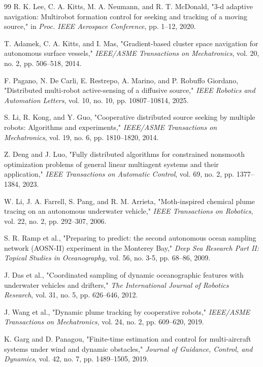 \documentclass[lettersize,journal]{IEEEtran}
\begin{document}
\begin{thebibliography}{99}
 R. K. Lee, C. A. Kitts, M. A. Neumann, and R. T. McDonald, "3-d adaptive navigation: Multirobot formation control for seeking and tracking of a moving source," in \textit{Proc. IEEE Aerospace Conference}, pp. 1--12, 2020.

 T. Adamek, C. A. Kitts, and I. Mas, "Gradient-based cluster space navigation for autonomous surface vessels," \textit{IEEE/ASME Transactions on Mechatronics}, vol. 20, no. 2, pp. 506--518, 2014.

 F. Pagano, N. De Carli, E. Restrepo, A. Marino, and P. Robuffo Giordano, "Distributed multi-robot active-sensing of a diffusive source," \textit{IEEE Robotics and Automation Letters}, vol. 10, no. 10, pp. 10807--10814, 2025.

 S. Li, R. Kong, and Y. Guo, "Cooperative distributed source seeking by multiple robots: Algorithms and experiments," \textit{IEEE/ASME Transactions on Mechatronics}, vol. 19, no. 6, pp. 1810--1820, 2014.

 Z. Deng and J. Luo, "Fully distributed algorithms for constrained nonsmooth optimization problems of general linear multiagent systems and their application," \textit{IEEE Transactions on Automatic Control}, vol. 69, no. 2, pp. 1377--1384, 2023.

 W. Li, J. A. Farrell, S. Pang, and R. M. Arrieta, "Moth-inspired chemical plume tracing on an autonomous underwater vehicle," \textit{IEEE Transactions on Robotics}, vol. 22, no. 2, pp. 292--307, 2006.

 S. R. Ramp et al., "Preparing to predict: the second autonomous ocean sampling network (AOSN-II) experiment in the Monterey Bay," \textit{Deep Sea Research Part II: Topical Studies in Oceanography}, vol. 56, no. 3-5, pp. 68--86, 2009.

 J. Das et al., "Coordinated sampling of dynamic oceanographic features with underwater vehicles and drifters," \textit{The International Journal of Robotics Research}, vol. 31, no. 5, pp. 626--646, 2012.

 J. Wang et al., "Dynamic plume tracking by cooperative robots," \textit{IEEE/ASME Transactions on Mechatronics}, vol. 24, no. 2, pp. 609--620, 2019.

 K. Garg and D. Panagou, "Finite-time estimation and control for multi-aircraft systems under wind and dynamic obstacles," \textit{Journal of Guidance, Control, and Dynamics}, vol. 42, no. 7, pp. 1489--1505, 2019.


\end{thebibliography}
\end{document}
